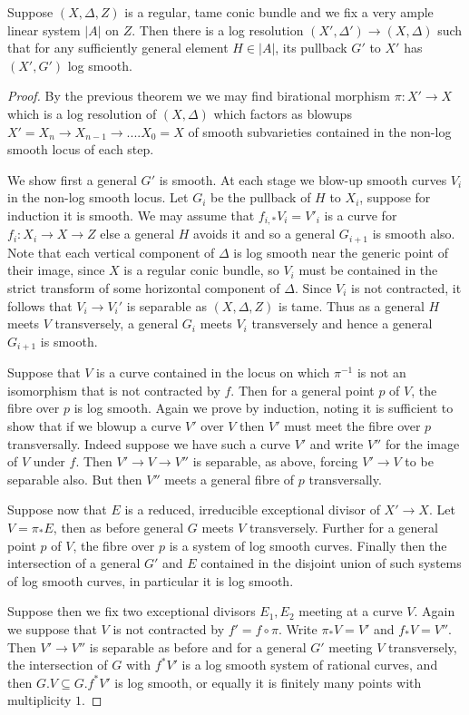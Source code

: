 \begin{corollary}
	Suppose $(X,\Delta,Z)$ is a regular, tame conic bundle and we fix a very ample linear system $|A|$ on $Z$.  Then there is a log resolution $(X',\Delta') \to (X,\Delta)$ such that for any sufficiently general element $H\in |A|$, its pullback $G'$ to $X'$ has $(X',G')$ log smooth.
\end{corollary}
\begin{proof}
	
	By the previous theorem we we may find birational morphism $\pi\colon X' \to X$ which is a log resolution of $(X,\Delta)$ which factors as blowups $X'=X_{n} \to X_{n-1} \to .... X_{0}=X$ of smooth subvarieties contained in the non-log smooth locus of each step.
	
	We show first a general $G'$ is smooth. At each stage we blow-up smooth curves $V_{i}$ in the non-log smooth locus. Let $G_{i}$ be the pullback of $H$ to $X_{i}$, suppose for induction it is smooth. We may assume that $f_{i,*}V_{i}=V'_{i}$ is a curve for $f_{i}\colon X_{i} \to X \to Z$ else a general $H$ avoids it and so a general $G_{i+1}$ is smooth also. Note that each vertical component of $\Delta$ is log smooth near the generic point of their image, since $X$ is a regular conic bundle, so $V_{i}$ must be contained in the strict transform of some horizontal component of $\Delta$. Since $V_{i}$ is not contracted, it follows that $V_{i} \to V_{i}'$ is separable as $(X,\Delta,Z)$ is tame. Thus as a general $H$ meets $V$ transversely, a general $G_{i}$ meets $V_{i}$ transversely and hence a general $G_{i+1}$ is smooth.
	
	Suppose that $V$ is a curve contained in the locus on which $\pi^{-1}$ is not an isomorphism that is not contracted by $f$. Then for a general point $p$ of $V$, the fibre over $p$ is log smooth. Again we prove by induction, noting it is sufficient to show that if we blowup a curve $V'$ over $V$ then $V'$ must meet the fibre over $p$ transversally. Indeed suppose we have such a curve $V'$ and write $V''$ for the image of $V$ under $f$. Then $V' \to V \to V''$ is separable, as above, forcing $V' \to V$ to be separable also. But then $V''$ meets a general fibre of $p$ transversally.
	
	Suppose now that $E$ is a reduced, irreducible exceptional divisor of $X'\to X$. Let $V=\pi_{*}E$, then as before general $G$ meets $V$ transversely. Further for a general point $p$ of $V$, the fibre over $p$ is a system of log smooth curves. Finally then the intersection of a general $G'$ and $E$ contained in the disjoint union of such systems of log smooth curves, in particular it is log smooth. 
	
	Suppose then we fix two exceptional divisors $E_{1},E_{2}$ meeting at a curve $V$. Again we suppose that $V$ is not contracted by $f'=f \circ \pi$. Write $\pi_{*}V=V'$ and $f_{*}V=V''$. Then $V' \to V''$ is separable as before and for a general $G'$ meeting $V$ transversely, the intersection of $G$ with $f^{*}V'$ is a log smooth system of rational curves, and then $G.V \subseteq G.f^{*}V'$ is log smooth, or equally it is finitely many points with multiplicity $1$. 
\end{proof}


